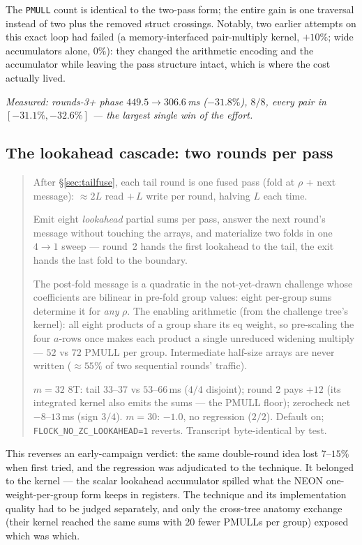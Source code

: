 \documentclass[11pt]{article}
\newcommand{\code}[1]{\texttt{#1}}
\newenvironment{optsummary}{%
  \begin{quote}\small
  \begin{description}
  \setlength{\itemsep}{1pt}\setlength{\parsep}{0pt}\setlength{\topsep}{2pt}
}{%
  \end{description}
  \end{quote}
}
\begin{document}
\noindent
The \code{PMULL} count is identical to the two-pass form; the entire gain is
one traversal instead of two plus the removed struct crossings. Notably, two
earlier attempts on this exact loop had failed (a memory-interfaced pair-multiply
kernel, $+10\%$; wide accumulators alone, $0\%$): they changed the arithmetic
encoding and the accumulator while leaving the pass structure intact, which is
where the cost actually lived.

\emph{Measured: rounds-3+ phase $449.5\to306.6\,$ms ($-31.8\%$), $8/8$,
every pair in $[-31.1\%,-32.6\%]$ --- the largest single win of the effort.}

\subsection{The lookahead cascade: two rounds per pass}
\label{sec:cascade}

\begin{optsummary}
\item[Baseline:] After \S\ref{sec:tailfuse}, each tail round is one fused pass (fold at $\rho$ + next message): $\approx2L$ read $+\,L$ write per round, halving $L$ each time.
\item[Improvement:] Emit eight \emph{lookahead} partial sums per pass, answer the next round's message without touching the arrays, and materialize two folds in one $4{\to}1$ sweep --- round~2 hands the first lookahead to the tail, the exit hands the last fold to the boundary.
\item[Mechanism:] The post-fold message is a quadratic in the not-yet-drawn challenge whose coefficients are bilinear in pre-fold group values: eight per-group sums determine it for \emph{any} $\rho$. The enabling arithmetic (from the challenge tree's kernel): all eight products of a group share its eq weight, so pre-scaling the four $a$-rows once makes each product a single unreduced widening multiply --- $52$ vs $72$ PMULL per group. Intermediate half-size arrays are never written ($\approx55\%$ of two sequential rounds' traffic).
\item[Result:] $m{=}32$ 8T: tail $33$--$37$ vs $53$--$66\,$ms ($4/4$ disjoint); round 2 pays $+12$ (its integrated kernel also emits the sums --- the PMULL floor); zerocheck net $-8$--$13\,$ms (sign $3/4$). $m{=}30$: $-1.0$, no regression ($2/2$). Default on; \code{FLOCK\_NO\_ZC\_LOOKAHEAD=1} reverts. Transcript byte-identical by test.
\end{optsummary}

This reverses an early-campaign verdict: the same double-round idea lost
$7$--$15\%$ when first tried, and the regression was adjudicated to the
technique. It belonged to the kernel --- the scalar lookahead
accumulator spilled what the NEON one-weight-per-group form keeps in
registers. The technique and its implementation quality had to be judged
separately, and only the cross-tree anatomy exchange (their kernel
reached the same sums with 20 fewer PMULLs per group) exposed which was
which.
\end{document}

